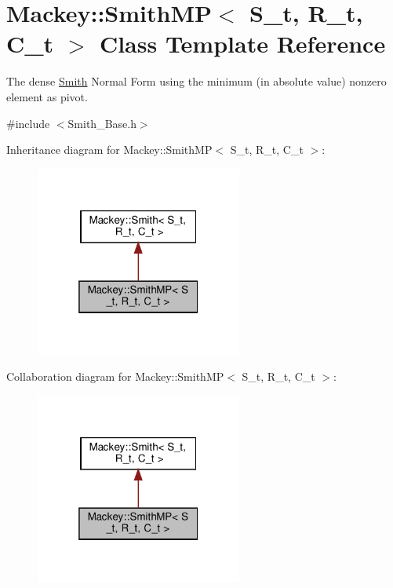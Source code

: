 \hypertarget{classMackey_1_1SmithMP}{}\section{Mackey\+:\+:Smith\+MP$<$ S\+\_\+t, R\+\_\+t, C\+\_\+t $>$ Class Template Reference}
\label{classMackey_1_1SmithMP}


The dense \hyperlink{classMackey_1_1Smith}{Smith} Normal Form using the minimum (in absolute value) nonzero element as pivot.  




{\ttfamily \#include $<$Smith\+\_\+\+Base.\+h$>$}



Inheritance diagram for Mackey\+:\+:Smith\+MP$<$ S\+\_\+t, R\+\_\+t, C\+\_\+t $>$\+:\nopagebreak
\begin{figure}[H]
\begin{center}
\leavevmode
\includegraphics[width=193pt]{classMackey_1_1SmithMP__inherit__graph}
\end{center}
\end{figure}


Collaboration diagram for Mackey\+:\+:Smith\+MP$<$ S\+\_\+t, R\+\_\+t, C\+\_\+t $>$\+:\nopagebreak
\begin{figure}[H]
\begin{center}
\leavevmode
\includegraphics[width=193pt]{classMackey_1_1SmithMP__coll__graph}
\end{center}
\end{figure}
